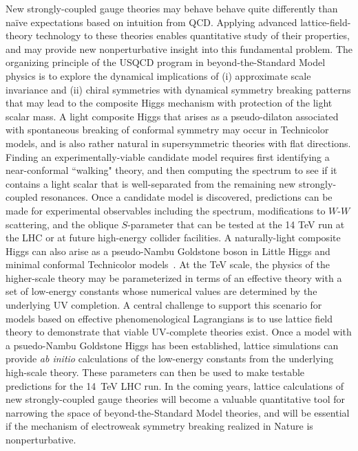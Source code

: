 \begin{itemize}
New strongly-coupled gauge theories may behave behave quite differently than na{\"i}ve expectations based on intuition from QCD.  Applying advanced lattice-field-theory technology to these theories enables quantitative study of their properties, and may provide new nonperturbative insight into this fundamental problem.  The organizing principle of the USQCD program in beyond-the-Standard Model physics is to explore the dynamical implications of (i) approximate scale invariance and (ii) chiral symmetries with dynamical symmetry breaking patterns that may lead to the composite Higgs mechanism with protection of the light scalar mass.  A light composite Higgs that arises as a pseudo-dilaton associated with spontaneous breaking of conformal symmetry may occur in Technicolor models, and is also rather natural in supersymmetric theories with flat directions.  Finding an experimentally-viable candidate model requires first identifying a near-conformal ``walking" theory, and then computing the spectrum to see if it contains a light scalar that is well-separated from the remaining new strongly-coupled resonances.   Once a candidate model is discovered, predictions can be made for experimental observables including the spectrum, modifications to $W$-$W$ scattering, and the oblique $S$-parameter that can be tested at the 14 TeV run at the LHC or at future high-energy collider facilities.  A naturally-light composite Higgs can also arise as a pseudo-Nambu Goldstone boson in Little Higgs and minimal conformal Technicolor models~\cite{ArkaniHamed:2002qy,Galloway:2010bp}.  At the TeV scale, the physics of the higher-scale theory may be parameterized in terms of an effective theory with a set of low-energy constants whose numerical values are determined by the underlying UV completion.   A central challenge to support this scenario for models based on effective phenomenological Lagrangians is to use lattice field theory to demonstrate that viable UV-complete theories exist.  Once a model with a psuedo-Nambu Goldstone Higgs has been established, lattice simulations can provide {\it ab initio} calculations of the low-energy constants from the underlying high-scale theory.  These parameters can then be used to make testable predictions for the 14~TeV LHC run.  In the coming years, lattice calculations of new strongly-coupled gauge theories will become a valuable quantitative tool for narrowing the space of beyond-the-Standard Model theories, and will be essential if the mechanism of electroweak symmetry breaking realized in Nature is nonperturbative.


\end{itemize}
